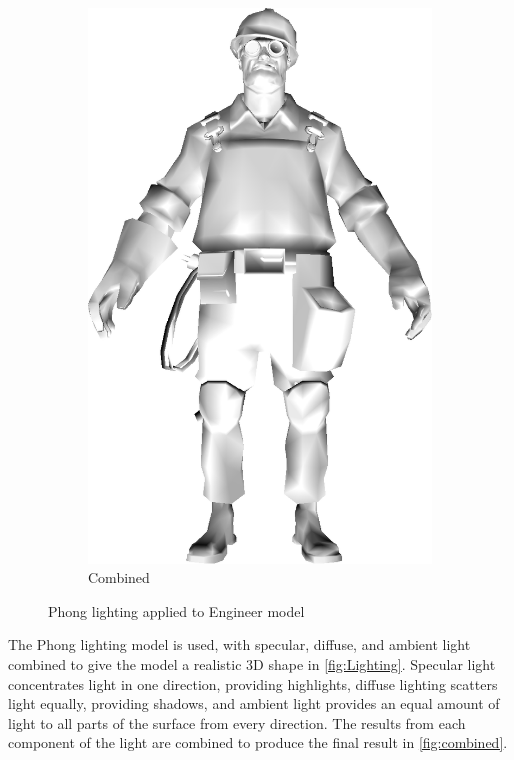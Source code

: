 \begin{figure}[h]
\begin{subfigure}[b]{0.18\textwidth}
        \includegraphics[width=\textwidth]{img/Lighting/combined.png}
        \caption{Combined}
        \label{fig:combined}
    \end{subfigure}
    \caption{Phong lighting applied to Engineer model}
    \label{fig:Lighting}
\end{figure}

The Phong lighting model is used, with specular, diffuse, and ambient light combined to give 
the model a realistic 3D shape in \autoref{fig:Lighting}. Specular light concentrates light in one direction, providing 
highlights, diffuse lighting scatters light equally, providing shadows, and ambient light provides 
an equal amount of light to all parts of the surface from every direction. The results from each component of the light are combined to produce the final result in \autoref{fig:combined}.

